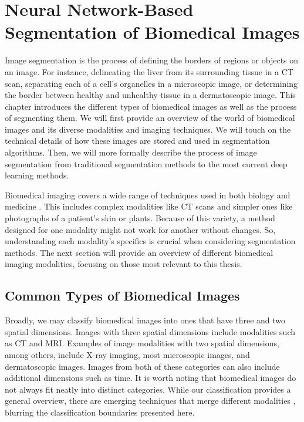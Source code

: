 \chapter{Neural Network-Based Segmentation of Biomedical Images}
\label{chap:seg-background}

Image segmentation is the process of defining the borders of regions or objects on an image. For instance, delineating the liver from its surrounding tissue in a CT scan, separating each of a cell's organelles in a microscopic image, or determining the border between healthy and unhealthy tissue in a dermatoscopic image. This chapter introduces the different types of biomedical images as well as the process of segmenting them. We will first provide an overview of the world of biomedical images and its diverse modalities and imaging techniques. We will touch on the technical details of how these images are stored and used in segmentation algorithms. Then, we will more formally describe the process of image segmentation from traditional segmentation methods to the most current deep learning methods.

Biomedical imaging covers a wide range of techniques used in both biology and medicine \cite{Wallyn2019}. This includes complex modalities like CT scans and simpler ones like photographs of a patient's skin or plants. Because of this variety, a method designed for one modality might not work for another without changes. So, understanding each modality's specifics is crucial when considering segmentation methods. The next section will provide an overview of different biomedical imaging modalities, focusing on those most relevant to this thesis.

\section{Common Types of Biomedical Images}

Broadly, we may classify biomedical images into ones that have three and two spatial dimensions. Images with three spatial dimensions include modalities such as CT and MRI. Examples of image modalities with two spatial dimensions, among others, include X-ray imaging, most microscopic images, and dermatoscopic images. Images from both of these categories can also include additional dimensions such as time. It is worth noting that biomedical images do not always fit neatly into distinct categories. While our classification provides a general overview, there are emerging techniques that merge different modalities \cite{strangmanQuantitativeComparisonSimultaneous2002}, blurring the classification boundaries presented here.

